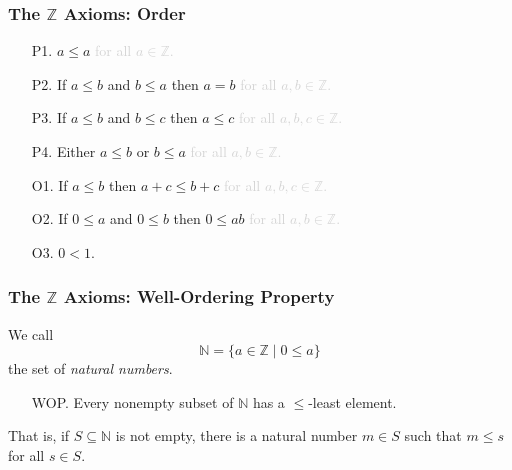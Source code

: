 \documentclass[handout]{beamer}
\begin{document}
\begin{frame}
\frametitle{The $\mathbb{Z}$ Axioms: Order}
\begin{itemize}
\item[P1.] $a \leq a$ \textcolor{lightgray}{for all $a \in \mathbb{Z}$.} \pause
\item[P2.] If $a \leq b$ and $b \leq a$ then $a = b$ \textcolor{lightgray}{for all $a,b \in \mathbb{Z}$.} \pause
\item[P3.] If $a \leq b$ and $b \leq c$ then $a \leq c$ \textcolor{lightgray}{for all $a,b,c \in \mathbb{Z}$.} \pause
\item[P4.] Either $a \leq b$ or $b \leq a$ \textcolor{lightgray}{for all $a,b \in \mathbb{Z}$.} \pause
\item[O1.] If $a \leq b$ then $a+c \leq b+c$ \textcolor{lightgray}{for all $a,b,c \in \mathbb{Z}$.} \pause
\item[O2.] If $0 \leq a$ and $0 \leq b$ then $0 \leq ab$ \textcolor{lightgray}{for all $a,b \in \mathbb{Z}$.} \pause
\item[O3.] $0 < 1$.
\end{itemize}
\end{frame}



\begin{frame}
\frametitle{The $\mathbb{Z}$ Axioms: Well-Ordering Property}

We call \[\mathbb{N} = \{a \in \mathbb{Z} \mid 0 \leq a\}\] the set of \emph{natural numbers}. \pause

\vspace{1cm}

\begin{itemize}
\item[WOP.] Every nonempty subset of $\mathbb{N}$ has a $\leq$-least element. \pause
\end{itemize}

\vspace{1cm}

That is, if $S \subseteq \mathbb{N}$ is not empty, there is a natural number $m \in S$ such that $m \leq s$ for all $s \in S$.
\end{frame}
\end{document}

